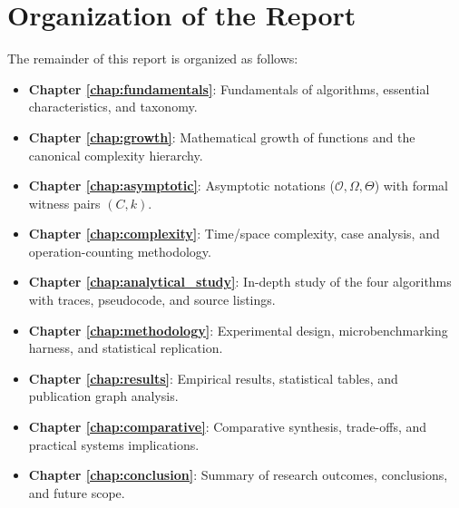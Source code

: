 \section{Organization of the Report}
The remainder of this report is organized as follows:
\begin{itemize}
    \item \textbf{Chapter \ref{chap:fundamentals}}: Fundamentals of algorithms, essential characteristics, and taxonomy.
    \item \textbf{Chapter \ref{chap:growth}}: Mathematical growth of functions and the canonical complexity hierarchy.
    \item \textbf{Chapter \ref{chap:asymptotic}}: Asymptotic notations ($\mathcal{O}, \Omega, \Theta$) with formal witness pairs $(C, k)$.
    \item \textbf{Chapter \ref{chap:complexity}}: Time/space complexity, case analysis, and operation-counting methodology.
    \item \textbf{Chapter \ref{chap:analytical_study}}: In-depth study of the four algorithms with traces, pseudocode, and source listings.
    \item \textbf{Chapter \ref{chap:methodology}}: Experimental design, microbenchmarking harness, and statistical replication.
    \item \textbf{Chapter \ref{chap:results}}: Empirical results, statistical tables, and publication graph analysis.
    \item \textbf{Chapter \ref{chap:comparative}}: Comparative synthesis, trade-offs, and practical systems implications.
    \item \textbf{Chapter \ref{chap:conclusion}}: Summary of research outcomes, conclusions, and future scope.
\end{itemize}
